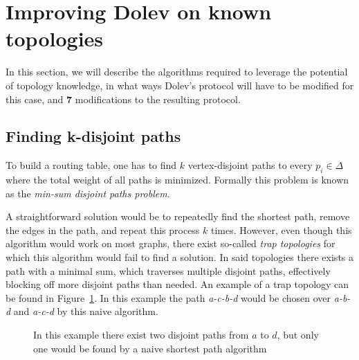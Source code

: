 \section{Improving Dolev on known topologies}
\label{contr-dolev}
In this section, we will describe the algorithms required to leverage the potential of topology knowledge, in what ways Dolev's protocol will have to be modified for this case, and \textbf{7} modifications to the resulting protocol.

\subsection{Finding k-disjoint paths}
To build a routing table, one has to find $k$ vertex-disjoint paths to every $p_i \in \Delta$ where the total weight of all paths is minimized. Formally this problem is known as the \textit{min-sum disjoint paths problem}.

A straightforward solution would be to repeatedly find the shortest path, remove the edges in the path, and repeat this process $k$ times. However, even though this algorithm would work on most graphs, there exist so-called \textit{trap topologies} for which this algorithm would fail to find a solution. In said topologies there exists a path with a minimal sum, which traverses multiple disjoint paths, effectively blocking off more disjoint paths than needed. An example of a trap topology can be found in Figure~\ref{contr:trap-topology}. In this example the path \textit{a-c-b-d} would be chosen over \textit{a-b-d} and \textit{a-c-d} by this naive algorithm.

\vspace{-0.12in}
\begin{figure}[h]
    \centering
    \caption{In this example there exist two disjoint paths from $a$ to $d$, but only one would be found by a naive shortest path algorithm}
    \label{contr:trap-topology}
\end{figure}
\vspace{-0.12in}

